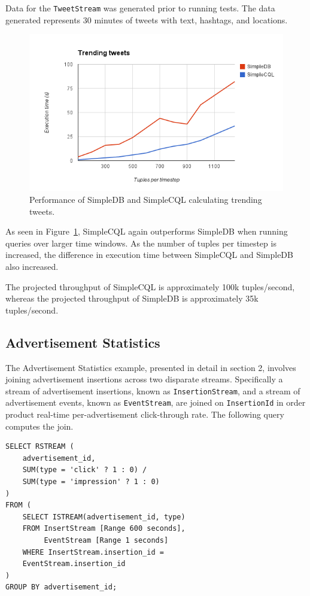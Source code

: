 \documentclass[a4paper, 10pt, conference]{IEEEconf}
\begin{document}
\vspace{3mm}

Data for the \texttt{TweetStream} was generated prior to running tests.  The data generated represents 30 minutes of tweets with text, hashtags, and locations.   

\begin{figure}[h!]
    \centering
    \centerline{\includegraphics[totalheight=5cm]{trending.png}}
    \caption{Performance of SimpleDB and SimpleCQL calculating trending tweets.}
    \label{fig:trending}
\end{figure}

As seen in Figure~\ref{fig:trending}, SimpleCQL again outperforms SimpleDB when running queries over larger time windows.  As the number of tuples per timestep is increased, the difference in execution time between SimpleCQL and SimpleDB also increased.

The projected throughput of SimpleCQL is approximately 100k tuples/second, whereas the projected throughput of SimpleDB is approximately 35k tuples/second.

\subsection{Advertisement Statistics}
The Advertisement Statistics example, presented in detail in section 2, involves joining advertisement insertions across two disparate streams.  Specifically a stream of advertisement insertions, known as \texttt{InsertionStream}, and a stream of advertisement events, known as \texttt{EventStream}, are joined on \texttt{InsertionId} in order product real-time per-advertisement click-through rate.  The following query computes the join.

\begin{lstlisting}
SELECT RSTREAM (
    advertisement_id,
    SUM(type = 'click' ? 1 : 0) / 
    SUM(type = 'impression' ? 1 : 0)
)
FROM (
    SELECT ISTREAM(advertisement_id, type)
    FROM InsertStream [Range 600 seconds], 
         EventStream [Range 1 seconds] 
    WHERE InsertStream.insertion_id = 
    EventStream.insertion_id
) 
GROUP BY advertisement_id;
\end{lstlisting}
\begingroup
{}
\endgroup
\end{document}
